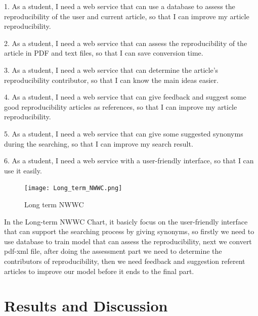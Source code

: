 \documentclass[
10pt, %
a4paper, %
oneside, %
headinclude,footinclude, %
BCOR5mm, %
]{scrartcl}
\begin{document}
1. As a student, I need a web service that can use a database to assess the reproducibility of the user and current article, so that I can improve my article reproducibility.

2. As a student, I need a web service that can assess the reproducibility of the article in PDF and text files, so that I can save conversion time.

3. As a student, I need a web service that can determine the article's reproducibility contributor, so that I can know the main ideas easier.

4. As a student, I need a web service that can give feedback and suggest some good reproducibility articles as references, so that I can improve my article reproducibility.

5. As a student, I need a web service that can give some suggested synonyms during the searching, so that I can improve my search result.

6. As a student, I need a web service with a user-friendly interface, so that I can use it easily.

\begin{figure}[h]
    \centering
    \texttt{[image: Long\_term\_NWWC.png]}
    \caption{Long term NWWC}
    \label{fig:Long term NWWC}
\end{figure}
\newpage

In the Long-term NWWC Chart, it basicly focus on the user-friendly interface that can support the searching process by giving synonyms, so firstly we need to use database to train model that can assess the reproducibility, next we convert pdf-xml file, after doing the assessment part we need to determine the contributors of reproducibility, then we need feedback and suggestion referent articles to improve our model before it ends to the final part.






\section{Results and Discussion}
\end{document}
